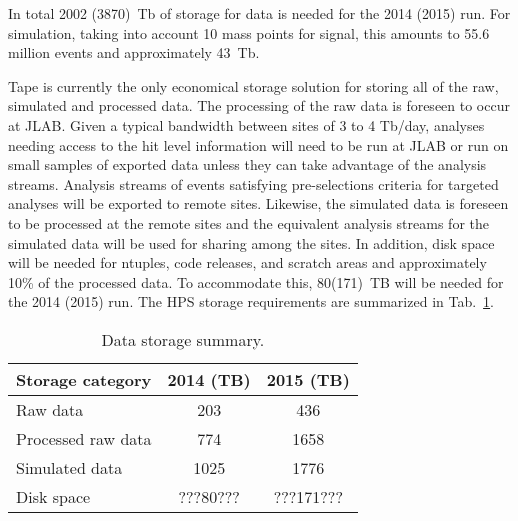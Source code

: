 In total 2002 (3870)~Tb of storage for data is needed for the 2014 (2015) run. For simulation, taking 
into account 10 mass points for signal, this amounts to 55.6 million events and approximately 43~Tb.

Tape is currently the only economical storage
solution for storing all of the raw, simulated and processed data.
The processing of the raw data is foreseen to occur at JLAB. Given a
typical bandwidth between sites of 3 to 4 Tb/day, analyses needing
access to the hit level information will need to be run at JLAB or run
on small samples of exported data unless they can take advantage of the
analysis streams. Analysis streams of events satisfying
pre-selections criteria for targeted analyses will be exported to remote
sites. Likewise, the simulated data is foreseen to be processed at the
remote sites and the equivalent analysis streams for the simulated data
will be used for sharing among the sites. In addition, disk space will be 
needed for ntuples, code releases, and scratch areas and approximately 10\% of the 
processed data. To accommodate this, 80(171)~TB will be needed for the 2014 (2015) run. 
The HPS storage requirements are summarized in Tab.~\ref{tab:datastorage}.
\begin{table}[tbp]
\centering
\begin{tabular}{|l|c|c|}
\hline
Storage category & 2014 (TB) & 2015 (TB) \\
\hline
Raw data & 203 & 436 \\
Processed raw data & 774 & 1658 \\
Simulated data & 1025 & 1776 \\
Disk space  & ???80???  & ???171??? \\
\hline
\end{tabular}
\caption{{\small Data storage summary.}}
\label{tab:datastorage}
\end{table}


